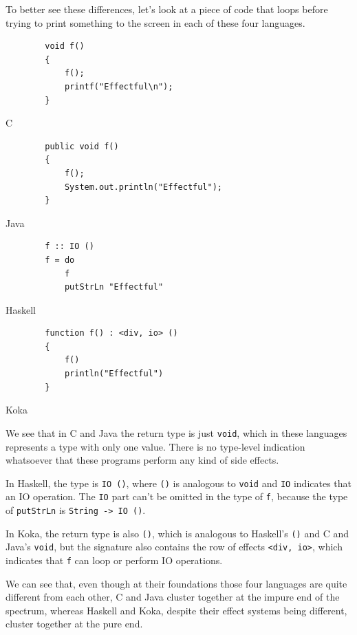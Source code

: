 \documentclass[declaration,inz,english,shortabstract]{iithesis}
\newcommand{\m}[1]{\texttt{#1}}
\begin{document}
To better see these differences, let's look at a piece of code that loops before trying to print something to the screen in each of these four languages.

\begin{listing}[H]
    \begin{verbatim}
        void f()
        {
            f();
            printf("Effectful\n");
        }
    \end{verbatim}
    \caption{C}
\end{listing}

\begin{listing}[H]
    \begin{verbatim}
        public void f()
        {
            f();
            System.out.println("Effectful");
        }
    \end{verbatim}
    \caption{Java}
\end{listing}

\begin{listing}[H]
    \begin{verbatim}
        f :: IO ()
        f = do
            f
            putStrLn "Effectful"
    \end{verbatim}
    \caption{Haskell}
\end{listing}

\begin{listing}[H]
    \begin{verbatim}
        function f() : <div, io> ()
        {
            f()
            println("Effectful")
        }
    \end{verbatim}
    \caption{Koka}
\end{listing}

We see that in C and Java the return type is just \m{void}, which in these languages represents a type with only one value. There is no type-level indication whatsoever that these programs perform any kind of side effects.

In Haskell, the type is \m{IO ()}, where \m{()} is analogous to \m{void} and \m{IO} indicates that an IO operation. The \m{IO} part can't be omitted in the type of \m{f}, because the type of \m{putStrLn} is \m{String -> IO ()}.

In Koka, the return type is also \m{()}, which is analogous to Haskell's \m{()} and C and Java's \m{void}, but the signature also contains the row of effects \m{<div, io>}, which indicates that \m{f} can loop or perform IO operations.

We can see that, even though at their foundations those four languages are quite different from each other, C and Java cluster together at the impure end of the spectrum, whereas Haskell and Koka, despite their effect systems being different, cluster together at the pure end.
\end{document}
